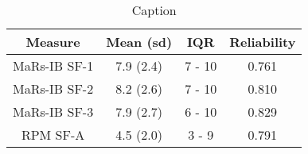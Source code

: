 \documentclass[a4paper,man,natbib]{apa6}
\begin{document}
\begin{table}
    \centering
    \begin{tabular}{c|c|c|c}
    Measure & Mean (sd) & IQR & Reliability \\
    \hline
    MaRs-IB SF-1 & 7.9 (2.4) & 7 - 10 & 0.761 \\
    MaRs-IB SF-2 & 8.2 (2.6) & 7 - 10 & 0.810 \\
    MaRs-IB SF-3 & 7.9 (2.7) & 6 - 10 & 0.829 \\
    RPM SF-A & 4.5 (2.0) & 3 - 9 & 0.791 \\
    \end{tabular}
    \caption{Caption}
    \label{table:2}
\end{table}
\end{document}
